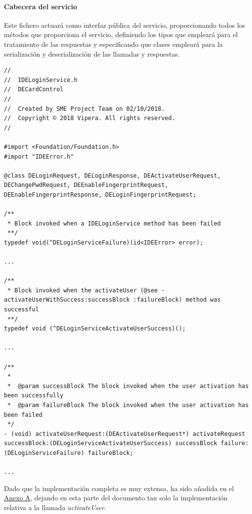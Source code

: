 \documentclass[a4paper, 12pt]{article}
\newenvironment{code}{\captionsetup{type=listing}}{}
\begin{document}
\paragraph{Cabecera del servicio}
\label{sec-4-2-3-1}
Este fichero actuará como interfaz pública del servicio, proporcionando todos los métodos que proporciona el servicio, definiendo los tipos que empleará para el tratamiento de las respuestas y
especificando que clases empleará para la serialización y deserialización de las llamadas y respuestas.
\begin{code}
\label{code:ios-interface-partial}
\begin{verbatim}
//
//  IDELoginService.h
//  DECardControl
//
//  Created by SME Project Team on 02/10/2018.
//  Copyright © 2018 Vipera. All rights reserved.
//

#import <Foundation/Foundation.h>
#import "IDEError.h"

@class DELoginRequest, DELoginResponse, DEActivateUserRequest, DEChangePwdRequest, DEEnableFingerprintRequest, DEEnableFingerprintResponse, DELoginFingerprintRequest;

/**
 * Block invoked when a IDELoginService method has been failed
 **/
typedef void(^DELoginServiceFailure)(id<IDEError> error);

...

/**
 * Block invoked when the activateUser (@see -activateUserWithSuccess:successBlock :failureBlock) method was successful
 **/
typedef void (^DELoginServiceActivateUserSuccess)();

...

/**
 *
 *  @param successBlock The block invoked when the user activation has been successfully
 *  @param failureBlock The block invoked when the user activation has been failed
 */
- (void) activateUserRequest:(DEActivateUserRequest*) activateRequest successBlock:(DELoginServiceActivateUserSuccess) successBlock failure:(DELoginServiceFailure) failureBlock;

...

\end{verbatim}
\end{code}
\bigbreak
Dado que la implementación completa es muy extensa, ha sido añadida en el \hyperref[code:ios-interface]{Anexo A}, dejando en esta parte del documento tan solo la implementación relativa a la llamada
\emph{activateUser}.
\end{document}
